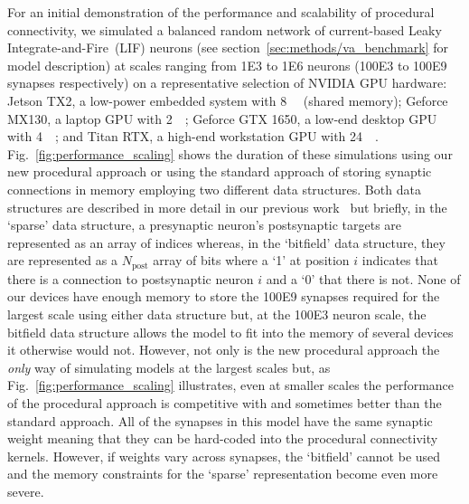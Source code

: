 \documentclass[9pt,a4paper]{amsart}
\begin{document}
For an initial demonstration of the performance and scalability of procedural connectivity, we simulated a balanced random network of current-based Leaky Integrate-and-Fire~(LIF) neurons (see section~\ref{sec:methods/va_benchmark} for model description) at scales ranging from \num{1E3} to \num{1E6} neurons (\num{100E3} to \num{100E9} synapses respectively) on a representative selection of NVIDIA GPU hardware:
Jetson TX2, a low-power embedded system with \SI{8}{\giga\byte} (shared memory);
Geforce MX130, a laptop GPU with \SI{2}{\giga\byte};
Geforce GTX 1650, a low-end desktop GPU with \SI{4}{\giga\byte};
and Titan RTX, a high-end workstation GPU with \SI{24}{\giga\byte}.
Fig.~\ref{fig:performance_scaling} shows the duration of these simulations using our new procedural approach or using the standard approach of storing synaptic connections in memory employing two different data structures.
Both data structures are described in more detail in our previous work~\citep{Knight2018} but briefly, in the `sparse' data structure, a presynaptic neuron's postsynaptic targets are represented as an array of indices whereas, in the `bitfield' data structure, they are represented as a $N_{\text{post}}$ array of bits where a `1' at position $i$ indicates that there is a connection to postsynaptic neuron $i$ and a `0' that there is not.
None of our devices have enough memory to store the \num{100E9} synapses required for the largest scale using either data structure but, at the \num{100E3} neuron scale, the bitfield data structure allows the model to fit into the memory of several devices it otherwise would not.
However, not only is the new procedural approach the \emph{only} way of simulating models at the largest scales but, as Fig.~\ref{fig:performance_scaling} illustrates, even at smaller scales the performance of the procedural approach is competitive with and sometimes better than the standard approach.
All of the synapses in this model have the same synaptic weight meaning that they can be hard-coded into the procedural connectivity kernels.
However, if weights vary across synapses, the `bitfield' cannot be used and the memory constraints for the `sparse' representation become even more severe.
%
\end{document}
